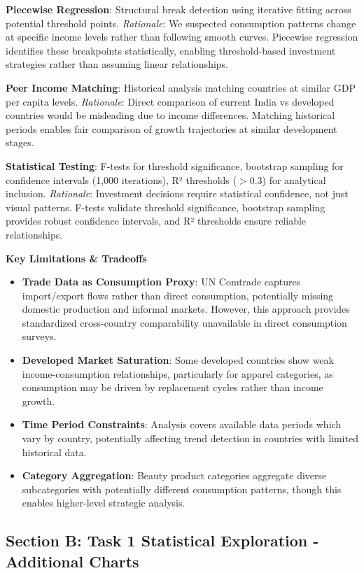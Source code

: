 \documentclass[11pt]{article}
\begin{document}
\textbf{Piecewise Regression}: Structural break detection using iterative fitting across potential threshold points. \textit{Rationale}: We suspected consumption patterns change at specific income levels rather than following smooth curves. Piecewise regression identifies these breakpoints statistically, enabling threshold-based investment strategies rather than assuming linear relationships.

\textbf{Peer Income Matching}: Historical analysis matching countries at similar GDP per capita levels. \textit{Rationale}: Direct comparison of current India vs developed countries would be misleading due to income differences. Matching historical periods enables fair comparison of growth trajectories at similar development stages.

\textbf{Statistical Testing}: F-tests for threshold significance, bootstrap sampling for confidence intervals (1,000 iterations), R² thresholds ($>$0.3) for analytical inclusion. \textit{Rationale}: Investment decisions require statistical confidence, not just visual patterns. F-tests validate threshold significance, bootstrap sampling provides robust confidence intervals, and R² thresholds ensure reliable relationships.

\textbf{Key Limitations \& Tradeoffs}

\begin{itemize}
    \item \textbf{Trade Data as Consumption Proxy}: UN Comtrade captures import/export flows rather than direct consumption, potentially missing domestic production and informal markets. However, this approach provides standardized cross-country comparability unavailable in direct consumption surveys.
    \item \textbf{Developed Market Saturation}: Some developed countries show weak income-consumption relationships, particularly for apparel categories, as consumption may be driven by replacement cycles rather than income growth.
    \item \textbf{Time Period Constraints}: Analysis covers available data periods which vary by country, potentially affecting trend detection in countries with limited historical data.
    \item \textbf{Category Aggregation}: Beauty product categories aggregate diverse subcategories with potentially different consumption patterns, though this enables higher-level strategic analysis.
\end{itemize}

\subsection*{Section B: Task 1 Statistical Exploration - Additional Charts}
\end{document}
